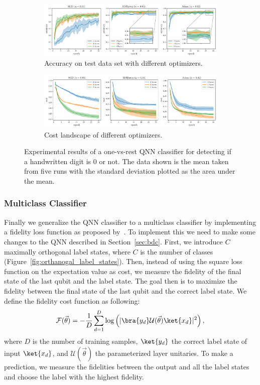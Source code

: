 \documentclass[a4paper,10pt]{article}
\begin{document}
\begin{figure}[ht]
	\centering
	\begin{subfigure}{1\textwidth}
		\centering
		\includegraphics[width=1\linewidth]{figures/qnn_ovr_accuracy.pdf}
		\caption{Accuracy on test data set with different optimizers.}
		\vspace*{4mm}
	\end{subfigure}
	\begin{subfigure}{1\textwidth}
		\centering
		\includegraphics[width=1\linewidth]{figures/qnn_ovr_cost.pdf}
		\caption{Cost landscape of different optimizers.}
	\end{subfigure}
	\caption{Experimental results of a one-vs-rest QNN classifier for detecting if a handwritten digit is 0 or not. The data shown is the mean taken from five runs with the standard deviation plotted as the area under the mean.}
	\label{fig:ovr_results}
\end{figure}

\subsubsection{Multiclass Classifier} \label{sec:multiclass_classifier}
Finally we generalize the QNN classifier to a multiclass classifier by implementing a fidelity loss function as proposed by~\textcite{perez2019data}.
To implement this we need to make some changes to the QNN described in Section~\ref{sec:bdc}.
First, we introduce $C$ maximally orthogonal label states, where $C$ is the number of classes (Figure~\ref{fig:orthanogal_label_states}).
Then, instead of using the square loss function on the expectation value as cost, we measure the fidelity of the final state of the last qubit and the label state.
The goal then is to maximize the fidelity between the final state of the last qubit and the correct label state.
We define the fidelity cost function as following:
\begin{equation}
\mathcal{F}(\vec{\theta}) = - \dfrac{1}{D} \sum_{d=1}^{D} \log \left( \lvert \bra{y_d}\mathcal{U}(\vec{\theta})\ket{x_d} \rvert^2\right),
\end{equation}
where $D$ is the number of training samples, $\ket{y_d}$ the correct label state of input $\ket{x_d}$, and $\mathcal{U}(\vec{\theta})$ the parameterized layer unitaries.
To make a prediction, we measure the fidelities between the output and all the label states and choose the label with the highest fidelity.
\end{document}
